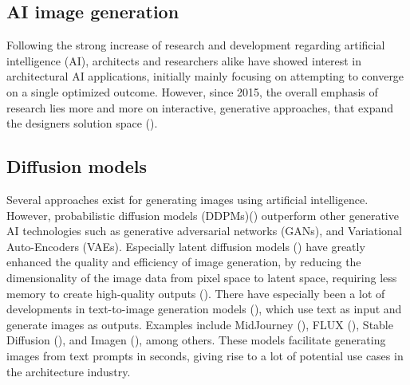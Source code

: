 \subsection{AI image generation}
Following the strong increase of research and development regarding artificial intelligence (AI), architects and researchers alike have showed interest in architectural AI applications, initially mainly focusing on attempting to converge on a single optimized outcome. However, since 2015, the overall emphasis of research lies more and more on interactive, generative approaches, that expand the designers solution space (\cite{castro_pena_artificial_2021}).\\
\subsection{Diffusion models}
Several approaches exist for generating images using artificial intelligence. However, probabilistic diffusion models (DDPMs)(\cite{ho_denoising_2020}) outperform other generative AI technologies such as generative adversarial networks (GANs),  and Variational Auto-Encoders (VAEs). Especially latent diffusion models (\cite{rombach_high-resolution_2022}) have greatly enhanced the quality and efficiency of image generation, by reducing the dimensionality of the image data from pixel space to latent space, requiring less memory to create high-quality outputs (\cite{li_generative_2025}). There have especially been a lot of developments in text-to-image generation models (\cite{zhang_text--image_2023}), which use text as input and generate images as outputs. Examples include MidJourney (\cite{noauthor_midjourney_nodate}), FLUX (\cite{noauthor_black-forest-labsflux1-dev_2025}), Stable Diffusion (\cite{rombach_high-resolution_2022}), and Imagen (\cite{noauthor_imagen_nodate}), among others. These models facilitate generating images from text prompts in seconds, giving rise to a lot of potential use cases in the architecture industry.
